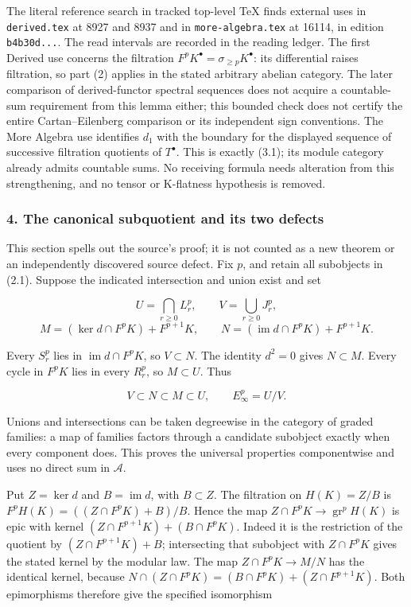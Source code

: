 \documentclass[11pt]{article}
\begin{document}
The literal reference search in tracked top-level TeX finds external uses in \texttt{derived.tex} at 8927 and 8937 and in \texttt{more-algebra.tex} at 16114, in edition \texttt{b4b30d...}. The read intervals are recorded in the reading ledger. The first Derived use concerns the filtration \(F^pK^\bullet=\sigma_{\geq p}K^\bullet\): its differential raises filtration, so part (2) applies in the stated arbitrary abelian category. The later comparison of derived-functor spectral sequences does not acquire a countable-sum requirement from this lemma either; this bounded check does not certify the entire Cartan--Eilenberg comparison or its independent sign conventions. The More Algebra use identifies \(d_1\) with the boundary for the displayed sequence of successive filtration quotients of \(T^\bullet\). This is exactly (3.1); its module category already admits countable sums. No receiving formula needs alteration from this strengthening, and no tensor or K-flatness hypothesis is removed.

\subsubsection{4. The canonical subquotient and its two defects}\label{the-canonical-subquotient-and-its-two-defects}

This section spells out the source's proof; it is not counted as a new theorem or an independently discovered source defect. Fix \(p\), and retain all subobjects in (2.1). Suppose the indicated intersection and union exist and set

\[
U=\bigcap_{r\geq0}L_r^p,\qquad V=\bigcup_{r\geq0}J_r^p,
\] \[
M=(\ker d\cap F^pK)+F^{p+1}K,\qquad
N=(\operatorname{im}d\cap F^pK)+F^{p+1}K.       \tag{4.1}
\]

Every \(S_r^p\) lies in \(\operatorname{im}d\cap F^pK\), so \(V\subset N\). The identity \(d^2=0\) gives \(N\subset M\). Every cycle in \(F^pK\) lies in every \(R_r^p\), so \(M\subset U\). Thus

\[
V\subset N\subset M\subset U,\qquad E_\infty^p=U/V.       \tag{4.2}
\]

Unions and intersections can be taken degreewise in the category of graded families: a map of families factors through a candidate subobject exactly when every component does. This proves the universal properties componentwise and uses no direct sum in \(\mathcal A\).

Put \(Z=\ker d\) and \(B=\operatorname{im}d\), with \(B\subset Z\). The filtration on \(H(K)=Z/B\) is \(F^pH(K)=((Z\cap F^pK)+B)/B\). Hence the map \(Z\cap F^pK\to\operatorname{gr}^pH(K)\) is epic with kernel \((Z\cap F^{p+1}K)+(B\cap F^pK)\). Indeed it is the restriction of the quotient by \((Z\cap F^{p+1}K)+B\); intersecting that subobject with \(Z\cap F^pK\) gives the stated kernel by the modular law. The map \(Z\cap F^pK\to M/N\) has the identical kernel, because \(N\cap(Z\cap F^pK)=(B\cap F^pK)+(Z\cap F^{p+1}K)\). Both epimorphisms therefore give the specified isomorphism
\end{document}
